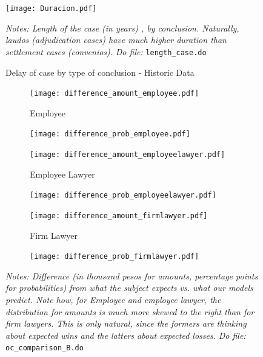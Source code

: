 \documentclass[11pt]{article}
\begin{document}
  
\begin{figure}[H]
    \caption{Delay of case by type of conclusion - Historic Data}
    \label{DurationFig}
    \begin{center}
        \texttt{[image: Duracion.pdf]}
        \end{center}
    {\footnotesize \textit{Notes: Length of the case (in years) , by conclusion. Naturally, laudos (adjudication cases) have much higher duration than settlement cases (convenios).}}
    {\footnotesize \textit{Do file: } \texttt{length\_case.do}}
\end{figure}



\begin{figure}[H]
    \caption{Difference in what actor says and calculator predicts in amount and probability. - Pilot}
    \label{Figure_overconfidence_exp}
    \begin{center}
    \begin{subfigure}{0.49\textwidth}
        \caption{Employee}
        \centering
        \texttt{[image: difference\_amount\_employee.pdf]}
    \end{subfigure}
     \begin{subfigure}{0.49\textwidth}
        \centering
        \texttt{[image: difference\_prob\_employee.pdf]}
    \end{subfigure}
    \begin{subfigure}{0.49\textwidth}
        \caption{Employee Lawyer}
        \centering
        \texttt{[image: difference\_amount\_employeelawyer.pdf]}
        \end{subfigure}
          \begin{subfigure}{0.49\textwidth}
        \centering
        \texttt{[image: difference\_prob\_employeelawyer.pdf]}
    \end{subfigure}
        \begin{subfigure}{0.49\textwidth}
            \caption{Firm Lawyer}
            \centering
            \texttt{[image: difference\_amount\_firmlawyer.pdf]}
    \end{subfigure}
    \begin{subfigure}{0.49\textwidth}
            \centering
            \texttt{[image: difference\_prob\_firmlawyer.pdf]}
        \end{subfigure}
    \end{center}
     \footnotesize \textit{Notes: Difference (in thousand pesos for amounts, percentage points for probabilities) from what the subject expects vs. what our models predict. Note how, for Employee and employee lawyer, the distribution for amounts is much more skewed to the right than for firm lawyers. This is only natural, since the formers are thinking about expected wins and the latters about expected losses.} 
      \footnotesize{ \textit{Do file: }  \texttt{oc\_comparison\_B.do}}
\end{figure}
\end{document}
